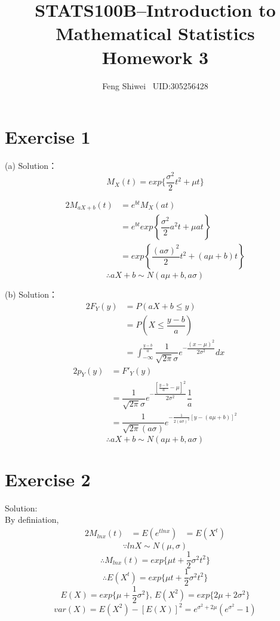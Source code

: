 \documentclass[a4papers]{ctexart}
\title{STATS100B--Introduction to Mathematical Statistics \\Homework 3}
\author{Feng Shiwei \ UID:305256428}
\date{}
\begin{document}
\maketitle
\section*{Exercise 1}
\noindent (a) Solution：\\
\indent 
\[ M_X(t) = exp\{{\dfrac{\sigma^2}{2}t^2+\mu t}\}  \]

\begin{alignat*}{2}
    M_{aX+b}\left( t\right) &=e^{bt}M_X\left( at\right) \\
    &=e^{bt}exp\left\{ \dfrac {\sigma ^{2}}{2}a^{2}t+\mu at\right\} \\
    &= exp\left\{ \dfrac {\left( a\sigma \right) ^{2}}{2}t^{2}+\left( a\mu +b\right) t\right\} 
\end{alignat*}
\[ \therefore aX+b\sim N(a\mu +b,a\sigma)\]

\noindent (b) Solution：\\
\begin{alignat*}{2}
    F_Y\left( y\right) &= P\left( aX+b\leq y\right) \\
    &= P(X\le\dfrac{y-b}{a}) \\
    &= \int _{-\infty}^{\frac {y-b}{ a}}\dfrac {1}{\sqrt {2\pi}\sigma }e^{-\dfrac {\left( x-\mu \right) ^{2}}{2\sigma ^{2}}}dx
\end{alignat*}
\begin{alignat*}{2}
p_{Y}\left( y\right) &= F'_{Y}\left( y\right)\\
    &=\dfrac {1}{\sqrt {2\pi }\sigma }e^{-\dfrac {\left[ \frac {y-b}{a}-\mu \right] ^{2}}{2\sigma ^{2}}}\dfrac {1}{a}\\
    &=\dfrac {1}{\sqrt {2\pi }\left( a\sigma \right) }e^{-\frac {1}{2\left( a\sigma \right)^2 }\left[ y-\left( a\mu +b\right) \right] ^{2}}
\end{alignat*}
\[
    \therefore aX+b \sim N(a\mu+b,a\sigma)    
\]

\section*{Exercise 2}
\noindent Solution:\\
By definiation, 
\begin{alignat*}{2}
   M_{lnx}(t) &= E(e^{tlnx})
          &= E(X^t)
\end{alignat*}
\[ \because lnX \sim N(\mu,\sigma)\]
\[ \therefore M_{lnx}(t) = exp\{\mu t+\dfrac{1}{2}\sigma^2t^2\} \]
\[ \therefore E(X^t) = exp\{\mu t+\dfrac{1}{2}\sigma^2t^2\} \]
\[ E(X)=exp\{\mu+\dfrac{1}{2}\sigma^2\},\,E(X^2)=exp\{2\mu+2\sigma^2\}\]
\[ var(X) = E(X^2)-[E(X)]^2 = e^{\sigma^2+2\mu}(e^{\sigma^2}-1)\]
\end{document}
